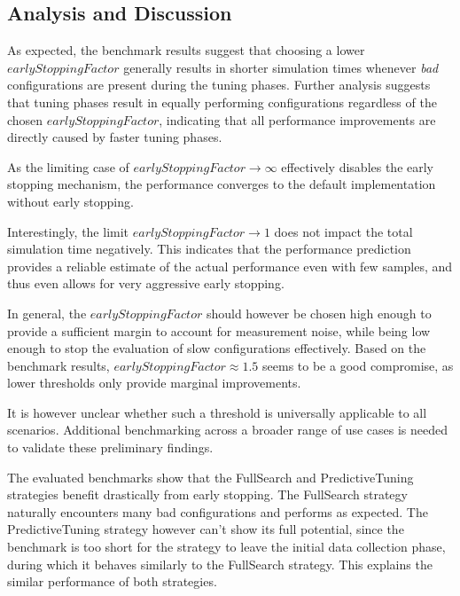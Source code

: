 \documentclass[conference]{IEEEtran}
\begin{document}
\subsection{Analysis and Discussion}
\begin{description}[leftmargin=1.2em, font=\itshape, style=nextline]
    \item[Impact of the Early Stopping Factor:]
        As expected, the benchmark results suggest that choosing a lower $earlyStoppingFactor$ generally results in shorter simulation times whenever \textit{bad} configurations are present during the tuning phases. Further analysis suggests that tuning phases result in equally performing configurations regardless of the chosen $earlyStoppingFactor$, indicating that all
        performance improvements are directly caused by faster tuning phases.

        As the limiting case of $earlyStoppingFactor \rightarrow \infty$ effectively disables the early stopping mechanism, the performance converges to the default implementation without early stopping.

        Interestingly, the limit $earlyStoppingFactor \rightarrow 1$ does not impact the total simulation time negatively. This indicates that the performance prediction provides a reliable estimate of the actual performance even with few samples, and thus even allows for very aggressive early stopping.

        In general, the $earlyStoppingFactor$ should however be chosen high enough to provide a sufficient margin to account for measurement noise, while being low enough to stop the evaluation of slow configurations effectively. Based on the benchmark results, $earlyStoppingFactor \approx 1.5$ seems to be a good compromise, as lower thresholds only provide marginal improvements.

        It is however unclear whether such a threshold is universally applicable to all scenarios. Additional benchmarking across a broader range of use cases is needed to validate these preliminary findings.

    \item[Impact of the Tuning Strategy:]
        The evaluated benchmarks show that the FullSearch and PredictiveTuning strategies benefit drastically from early stopping. The FullSearch strategy naturally encounters many bad configurations and performs as expected. The PredictiveTuning strategy however can't show its full potential, since the benchmark is too short for the strategy to leave the initial data collection phase, during which it behaves similarly to the FullSearch strategy. This explains the similar performance of both strategies.


\end{description}
\end{document}
